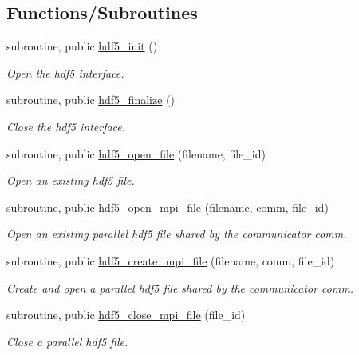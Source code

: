 \subsection*{Functions/\+Subroutines}
\begin{DoxyCompactItemize}
\item 
subroutine, public \hyperlink{namespacemodhdf5_a78ec7a0bfdcd60f1ce1ecf0c88bb7cd9}{hdf5\+\_\+init} ()
\begin{DoxyCompactList}\small\item\em Open the hdf5 interface. \end{DoxyCompactList}\item 
subroutine, public \hyperlink{namespacemodhdf5_ace643e6a3e592dbe1be4d158888eb477}{hdf5\+\_\+finalize} ()
\begin{DoxyCompactList}\small\item\em Close the hdf5 interface. \end{DoxyCompactList}\item 
subroutine, public \hyperlink{namespacemodhdf5_a11539d06d180bff29d3c56ba198451d4}{hdf5\+\_\+open\+\_\+file} (filename, file\+\_\+id)
\begin{DoxyCompactList}\small\item\em Open an existing hdf5 file. \end{DoxyCompactList}\item 
subroutine, public \hyperlink{namespacemodhdf5_a9f6976ee158485f6b203635df23156e3}{hdf5\+\_\+open\+\_\+mpi\+\_\+file} (filename, comm, file\+\_\+id)
\begin{DoxyCompactList}\small\item\em Open an existing \textquotesingle{}parallel\textquotesingle{} hdf5 file shared by the communicator comm. \end{DoxyCompactList}\item 
subroutine, public \hyperlink{namespacemodhdf5_aba50f37e2c24ac3271cdfc8877ebdcd9}{hdf5\+\_\+create\+\_\+mpi\+\_\+file} (filename, comm, file\+\_\+id)
\begin{DoxyCompactList}\small\item\em Create and open a \textquotesingle{}parallel\textquotesingle{} hdf5 file shared by the communicator comm. \end{DoxyCompactList}\item 
subroutine, public \hyperlink{namespacemodhdf5_a72cb805582425e8633c70c5db85df8bc}{hdf5\+\_\+close\+\_\+mpi\+\_\+file} (file\+\_\+id)
\begin{DoxyCompactList}\small\item\em Close a \textquotesingle{}parallel\textquotesingle{} hdf5 file. \end{DoxyCompactList}\item 

\end{DoxyCompactItemize}
